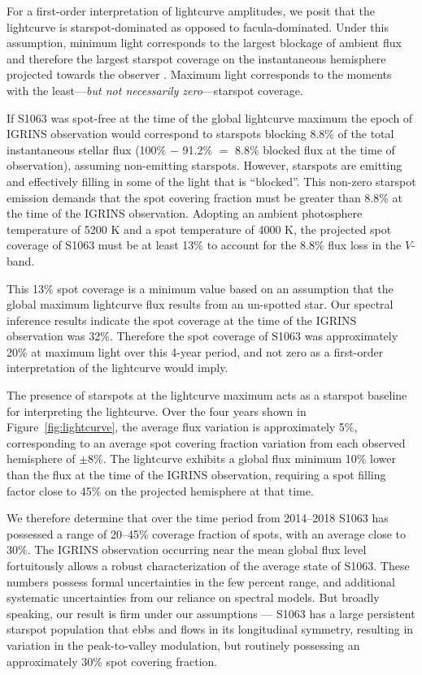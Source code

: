\documentclass[trackchanges]{aastex631}
\begin{document}
For a first-order interpretation of lightcurve amplitudes, we posit that the lightcurve is starspot-dominated as opposed to facula-dominated.  Under this assumption, minimum light corresponds to the largest blockage of ambient flux and therefore the largest starspot coverage on the instantaneous hemisphere projected towards the observer \citep{basri18}.  Maximum light corresponds to the moments with the least---\emph{but not necessarily zero}---starspot coverage.

If S1063 was spot-free at the time of the global lightcurve maximum the epoch of IGRINS observation would correspond to starspots blocking 8.8\% of the total instantaneous stellar flux (100\% $-$ 91.2\% $=$ 8.8\% blocked flux at the time of observation), assuming non-emitting starspots. However, starspots are emitting and effectively filling in some of the light that is ``blocked''.  This non-zero starspot emission demands that the spot covering fraction must be greater than 8.8\% at the time of the IGRINS observation. Adopting an ambient photosphere temperature of 5200 K and a spot temperature of 4000 K, the projected spot coverage of S1063 must be at least 13\% to account for the 8.8\% flux loss in the $V$-band.

This 13\% spot coverage is a minimum value based on an assumption that the global maximum lightcurve flux results from an un-spotted star. Our spectral inference results indicate the spot coverage at the time of the IGRINS observation was 32\%.  Therefore the spot coverage of S1063 was approximately 20\% at maximum light over this 4-year period, and not zero as a first-order interpretation of the lightcurve would imply.

The presence of starspots at the lightcurve maximum acts as a starspot baseline for interpreting the lightcurve. Over the four years shown in Figure~\ref{fig:lightcurve}, the average flux variation is approximately 5\%, corresponding to an average spot covering fraction variation from each observed hemisphere of $\pm$8\%. The lightcurve exhibits a global flux minimum 10\% lower than the flux at the time of the IGRINS observation, requiring a spot filling factor close to 45\% on the projected hemisphere at that time.

We therefore determine that over the time period from 2014--2018 S1063 has possessed a range of 20--45\% coverage fraction of spots, with an average close to 30\%. The IGRINS observation occurring near the mean global flux level fortuitously allows a robust characterization of the average state of S1063. These numbers possess formal uncertainties in the few percent range, and additional systematic uncertainties from our reliance on spectral models.  But broadly speaking, our result is firm under our assumptions --- S1063 has a large persistent starspot population that ebbs and flows in its longitudinal symmetry, resulting in variation in the peak-to-valley modulation, but routinely possessing an approximately 30\% spot covering fraction.
\end{document}
